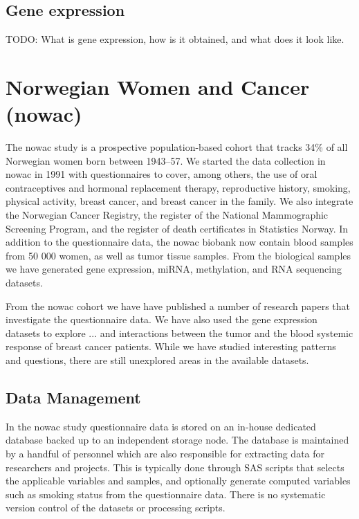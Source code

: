 \subsection{Gene expression} 
TODO: What is gene expression, how is it obtained, and what does it look like.

\section{Norwegian Women and Cancer (\gls{nowac})} 
The \gls{nowac} study is a prospective population-based cohort that tracks 34\%
of all Norwegian women born between 1943–57.\cite{lund2007cohort} We started the
data collection in \gls{nowac} in 1991 with questionnaires to cover, among
others, the use of oral contraceptives and hormonal replacement therapy,
reproductive history, smoking, physical activity, breast cancer, and breast
cancer in the family.  We also integrate the Norwegian Cancer Registry, the
register of the National Mammographic Screening Program, and the register of
death certificates in Statistics Norway.  In addition to the questionnaire data,
the \gls{nowac} biobank now contain blood samples from 50 000 women, as well as
tumor tissue samples. From the biological samples we have generated gene
expression, miRNA, methylation, and RNA sequencing datasets. 

From the \gls{nowac} cohort we have have published a number of research papers
that investigate the questionnaire data\cite{find-some-papers}. We have also
used the gene expression datasets to explore ... and interactions between the
tumor and the blood systemic response of breast cancer
patients.\cite{dumeaux2017interactions} While we have studied interesting
patterns and questions, there are still unexplored areas in the available
datasets.

\subsection{Data Management} 
In the \gls{nowac} study questionnaire data is stored on an in-house dedicated
database backed up to an independent storage node. The database is maintained by
a handful of personnel which are also responsible for extracting data for
researchers and projects. This is typically done through SAS scripts that
selects the applicable variables and samples, and optionally generate computed
variables such as smoking status from the questionnaire data. There is no
systematic version control of the datasets or processing scripts. 

